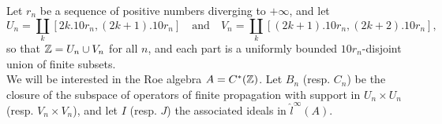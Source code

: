 Let $r_n$ be a sequence of positive numbers diverging to $+\infty$, and let 
\[U_n = \coprod_k [ 2k . 10 r_n  , (2k+1).10 r_n ] \quad \text{and}\quad V_n = \coprod_k [ (2k+1) . 10  r_n , (2k+2) . 10 r_n ],\]
so that $\mathbb Z = U_n \cup V_n$ for all $n$, and each part is a uniformly bounded $10r_n$-disjoint union of finite subsets.\\

We will be interested in the Roe algebra $A=C^*(\mathbb Z)$. Let  $B_n$ (resp. $C_n$) be the closure of the subspace of operators of finite propagation with support in $U_n \times U_n$ (resp. $V_n\times V_n$), and let $I$ (resp. $J$) the associated ideals in $\hat l^\infty (A)$.\\



